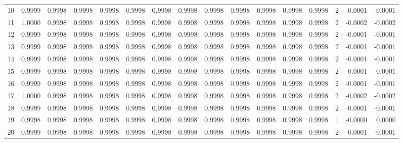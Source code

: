 \begin{tabular}{lrrrrrrrrrrrrrrr}
10  &      0.9999 &  0.9998 &  0.9998 &  0.9998 &  0.9998 &  0.9998 &  0.9998 &  0.9998 &  0.9998 &  0.9998 &   0.9998 &     0.9998 &      2 &                   -0.0001 &                    -0.0001 \\
11  &      1.0000 &  0.9998 &  0.9998 &  0.9998 &  0.9998 &  0.9998 &  0.9998 &  0.9998 &  0.9998 &  0.9998 &   0.9998 &     0.9998 &      2 &                   -0.0002 &                    -0.0002 \\
12  &      0.9999 &  0.9998 &  0.9998 &  0.9998 &  0.9998 &  0.9998 &  0.9998 &  0.9998 &  0.9998 &  0.9998 &   0.9998 &     0.9998 &      2 &                   -0.0001 &                    -0.0001 \\
13  &      0.9999 &  0.9998 &  0.9998 &  0.9998 &  0.9998 &  0.9998 &  0.9998 &  0.9998 &  0.9998 &  0.9998 &   0.9998 &     0.9998 &      2 &                   -0.0001 &                    -0.0001 \\
14  &      0.9999 &  0.9998 &  0.9998 &  0.9998 &  0.9998 &  0.9998 &  0.9998 &  0.9998 &  0.9998 &  0.9998 &   0.9998 &     0.9998 &      2 &                   -0.0001 &                    -0.0001 \\
15  &      0.9999 &  0.9998 &  0.9998 &  0.9998 &  0.9998 &  0.9998 &  0.9998 &  0.9998 &  0.9998 &  0.9998 &   0.9998 &     0.9998 &      2 &                   -0.0001 &                    -0.0001 \\
16  &      0.9999 &  0.9998 &  0.9998 &  0.9998 &  0.9998 &  0.9998 &  0.9998 &  0.9998 &  0.9998 &  0.9998 &   0.9998 &     0.9998 &      2 &                   -0.0001 &                    -0.0001 \\
17  &      1.0000 &  0.9998 &  0.9998 &  0.9998 &  0.9998 &  0.9998 &  0.9998 &  0.9998 &  0.9998 &  0.9998 &   0.9998 &     0.9998 &      2 &                   -0.0002 &                    -0.0002 \\
18  &      0.9999 &  0.9998 &  0.9998 &  0.9998 &  0.9998 &  0.9998 &  0.9998 &  0.9998 &  0.9998 &  0.9998 &   0.9998 &     0.9998 &      2 &                   -0.0001 &                    -0.0001 \\
19  &      0.9998 &  0.9998 &  0.9998 &  0.9998 &  0.9998 &  0.9998 &  0.9998 &  0.9998 &  0.9998 &  0.9998 &   0.9998 &     0.9998 &      1 &                   -0.0000 &                     0.0000 \\
20  &      0.9999 &  0.9998 &  0.9998 &  0.9998 &  0.9998 &  0.9998 &  0.9998 &  0.9998 &  0.9998 &  0.9998 &   0.9998 &     0.9998 &      2 &                   -0.0001 &                    -0.0001 \\

\end{tabular}
